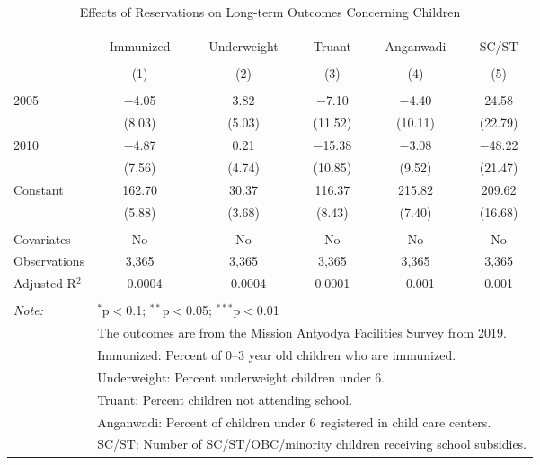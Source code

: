 
\begin{table}[!htbp] \centering 
  \caption{Effects of Reservations on Long-term Outcomes Concerning Children} 
  \label{raj_shrug_children_05_10} 
\scriptsize 
\begin{tabular}{@{\extracolsep{0pt}}lccccc} 
\\[-1.8ex]\hline 
\hline \\[-1.8ex] 
 & Immunized & Underweight & Truant & Anganwadi & SC/ST \\ 
\\[-1.8ex] & (1) & (2) & (3) & (4) & (5)\\ 
\hline \\[-1.8ex] 
 2005 & $-$4.05 & 3.82 & $-$7.10 & $-$4.40 & 24.58 \\ 
  & (8.03) & (5.03) & (11.52) & (10.11) & (22.79) \\ 
  2010 & $-$4.87 & 0.21 & $-$15.38 & $-$3.08 & $-$48.22 \\ 
  & (7.56) & (4.74) & (10.85) & (9.52) & (21.47) \\ 
  Constant & 162.70 & 30.37 & 116.37 & 215.82 & 209.62 \\ 
  & (5.88) & (3.68) & (8.43) & (7.40) & (16.68) \\ 
 \hline \\[-1.8ex] 
Covariates & No & No & No & No & No \\ 
Observations & 3,365 & 3,365 & 3,365 & 3,365 & 3,365 \\ 
Adjusted R$^{2}$ & $-$0.0004 & $-$0.0004 & 0.0001 & $-$0.001 & 0.001 \\ 
\hline 
\hline \\[-1.8ex] 
\textit{Note:}  & \multicolumn{5}{l}{$^{*}$p$<$0.1; $^{**}$p$<$0.05; $^{***}$p$<$0.01} \\ 
 & \multicolumn{5}{l}{The outcomes are from the Mission Antyodya Facilities Survey from 2019.} \\ 
 & \multicolumn{5}{l}{Immunized: Percent of 0--3 year old children who are immunized.} \\ 
 & \multicolumn{5}{l}{Underweight: Percent underweight children under 6.} \\ 
 & \multicolumn{5}{l}{Truant: Percent children not attending school.} \\ 
 & \multicolumn{5}{l}{Anganwadi: Percent of children under 6 registered in child care centers.} \\ 
 & \multicolumn{5}{l}{SC/ST: Number of SC/ST/OBC/minority children receiving school subsidies.} \\ 
\end{tabular} 
\end{table} 
